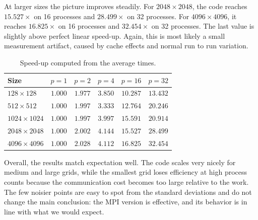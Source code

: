 \documentclass[10pt,a4paper]{article}
\begin{document}
At larger sizes the picture improves steadily. For $2048\times 2048$, the code reaches $15.527\times$ on 16 processes and $28.499\times$ on 32 processes. For $4096\times 4096$, it reaches $16.825\times$ on 16 processes and $32.454\times$ on 32 processes. The last value is slightly above perfect linear speed-up. Again, this is most likely a small measurement artifact, caused by cache effects and normal run to run variation.

\begin{table}[h]
    \centering
    \caption{Speed-up computed from the average times.}
    \label{tab:speedup}
    \small
    \setlength{\tabcolsep}{7pt}
    \renewcommand{\arraystretch}{1.1}
    \begin{tabular}{lccccc}
        \toprule
        Size & $p=1$ & $p=2$ & $p=4$ & $p=16$ & $p=32$ \\
        \midrule
        $128\times128$   & $1.000$ & $1.977$ & $3.850$ & $10.287$ & $13.432$ \\
        $512\times512$   & $1.000$ & $1.997$ & $3.333$ & $12.764$ & $20.246$ \\
        $1024\times1024$ & $1.000$ & $1.997$ & $3.997$ & $15.591$ & $20.914$ \\
        $2048\times2048$ & $1.000$ & $2.002$ & $4.144$ & $15.527$ & $28.499$ \\
        $4096\times4096$ & $1.000$ & $2.028$ & $4.112$ & $16.825$ & $32.454$ \\
        \bottomrule
    \end{tabular}
\end{table}

Overall, the results match expectation well. The code scales very nicely for medium and large grids, while the smallest grid loses efficiency at high process counts because the communication cost becomes too large relative to the work. The few noisier points are easy to spot from the standard deviations and do not change the main conclusion: the MPI version is effective, and its behavior is in line with what we would expect.
\end{document}
